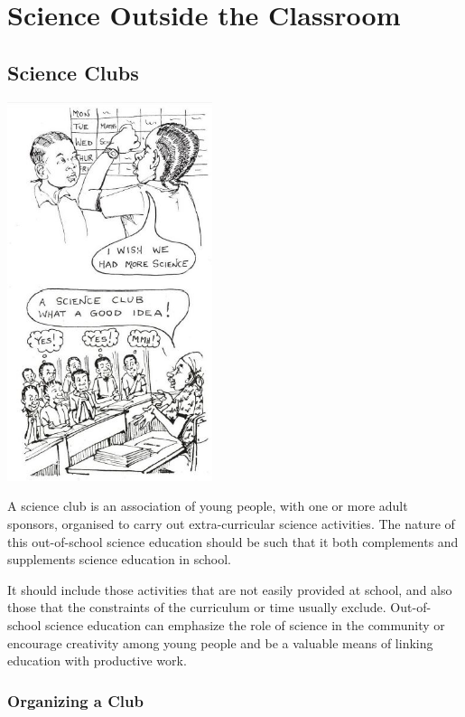 \chapter{Science Outside the Classroom}

\begin{multicols}{2}

\section{Science Clubs}

\begin{center}
\includegraphics[width=0.45\textwidth]{./img/source/science-clubs.jpg}
\end{center}

A science club is an association of young
people, with one or more adult sponsors,
organised to carry out extra-curricular science
activities. The nature of this out-of-school
science education should be such that it both
complements and supplements science
education in school. 

It should include those
activities that are not easily provided at school,
and also those that the constraints of the
curriculum or time usually exclude. Out-of-school
science education can emphasize the
role of science in the community or encourage
creativity among young people and be a valuable
means of linking education with productive
work.


\subsection{Organizing a Club}


\end{multicols}
